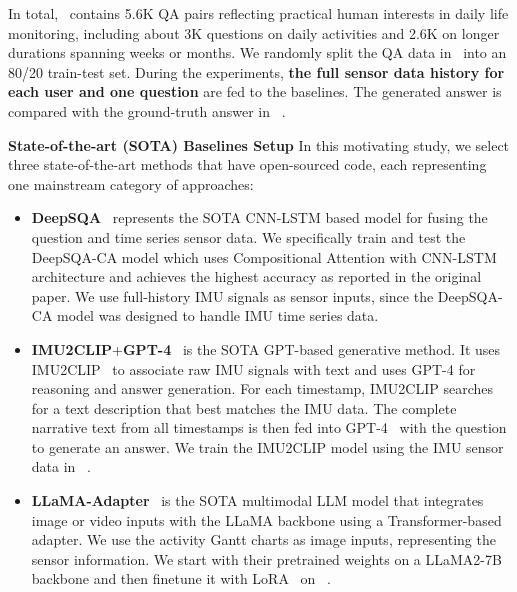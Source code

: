 In total, \Dataset~\citesensorqa contains 5.6K QA pairs reflecting practical human interests in daily life monitoring, including about 3K questions on daily activities and 2.6K on longer durations spanning weeks or months. We randomly split the QA data in \Dataset~\citesensorqa into an 80/20 train-test set. 
%
During the experiments, \textbf{the full sensor data history for each user and one question} are fed to the baselines.
The generated answer is compared with the ground-truth answer in \Dataset~\citesensorqa. 



\textbf{State-of-the-art (SOTA) Baselines Setup} 
In this motivating study, we select three state-of-the-art methods that have open-sourced code, each representing one mainstream category of approaches:
\begin{itemize}
 \item \textbf{DeepSQA}~\cite{xing2021deepsqa} represents the SOTA CNN-LSTM based model for fusing the question and time series sensor data. We specifically train and test the DeepSQA-CA model which uses Compositional Attention with CNN-LSTM architecture and achieves the highest accuracy as reported in the original paper. We use full-history IMU signals as sensor inputs, since the DeepSQA-CA model was designed to handle IMU time series data.
 \item \textbf{IMU2CLIP}+\textbf{GPT-4}~\cite{moon-etal-2023-imu2clip} is the SOTA GPT-based generative method. It uses IMU2CLIP~\cite{moon-etal-2023-imu2clip} to associate raw IMU signals with text and uses GPT-4 for reasoning and answer generation. For each timestamp, IMU2CLIP searches for a text description that best matches the IMU data. The complete narrative text from all timestamps is then fed into GPT-4~\cite{gpt-4} with the question to generate an answer.
 We train the IMU2CLIP model using the IMU sensor data in \Dataset~\citesensorqa. %
 \item \textbf{LLaMA-Adapter}~\cite{zhang2023llama} is the SOTA multimodal LLM model that integrates image or video inputs with the LLaMA backbone using a Transformer-based adapter. We use the activity Gantt charts as image inputs, representing the sensor information. We start with their pretrained weights on a LLaMA2-7B~\cite{touvron2023llama} backbone and then finetune it with LoRA~\cite{hu2021lora} on \Dataset~\citesensorqa. 
\end{itemize}

